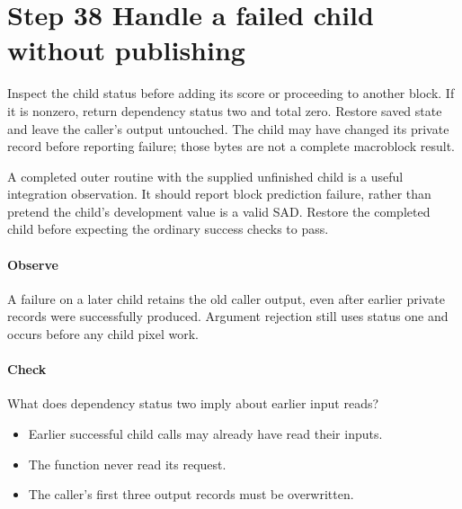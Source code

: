 \section{Step 38 Handle a failed child without publishing}\label{h263-macroblock-s08}
Inspect the child status before adding its score or proceeding to another block.
If it is nonzero, return dependency status two and total zero. Restore saved state
and leave the caller's output untouched. The child may have changed its private
record before reporting failure; those bytes are not a complete macroblock result.

A completed outer routine with the supplied unfinished child is a useful
integration observation. It should report block prediction failure, rather than
pretend the child's development value is a valid SAD. Restore the completed child
before expecting the ordinary success checks to pass.

\paragraph{Observe} A failure on a later child retains the old caller output,
even after earlier private records were successfully produced. Argument rejection
still uses status one and occurs before any child pixel work.
\paragraph{Check} What does dependency status two imply about earlier input reads?
\begin{itemize}
  \item[A.] Earlier successful child calls may already have read their inputs.
  \item[B.] The function never read its request.
  \item[C.] The caller's first three output records must be overwritten.
\end{itemize}
